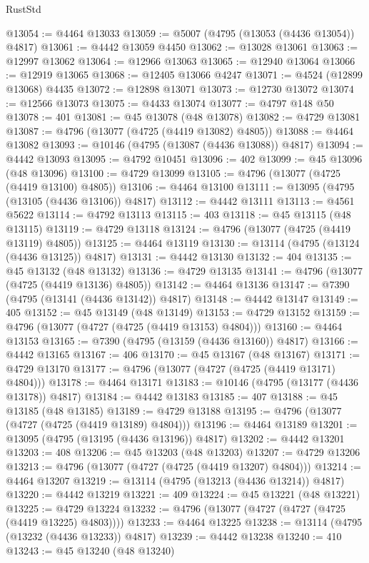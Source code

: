 \begin{lexlean}{RustStd}
\begin{coremodule}
@13054 := @4464 @13033
@13059 := @5007 (@4795 (@13053 (@4436 @13054)) @4817)
@13061 := @4442 @13059 @4450
@13062 := @13028 @13061
@13063 := @12997 @13062
@13064 := @12966 @13063
@13065 := @12940 @13064
@13066 := @12919 @13065
@13068 := @12405 @13066 @4247
@13071 := @4524 (@12899 @13068) @4435
@13072 := @12898 @13071
@13073 := @12730 @13072
@13074 := @12566 @13073
@13075 := @4433 @13074
@13077 := @4797 @148 @50
@13078 := 401
@13081 := @45 @13078 (@48 @13078)
@13082 := @4729 @13081
@13087 := @4796 (@13077 (@4725 (@4419 @13082) @4805))
@13088 := @4464 @13082
@13093 := @10146 (@4795 (@13087 (@4436 @13088)) @4817)
@13094 := @4442 @13093
@13095 := @4792 @10451
@13096 := 402
@13099 := @45 @13096 (@48 @13096)
@13100 := @4729 @13099
@13105 := @4796 (@13077 (@4725 (@4419 @13100) @4805))
@13106 := @4464 @13100
@13111 := @13095 (@4795 (@13105 (@4436 @13106)) @4817)
@13112 := @4442 @13111
@13113 := @4561 @5622
@13114 := @4792 @13113
@13115 := 403
@13118 := @45 @13115 (@48 @13115)
@13119 := @4729 @13118
@13124 := @4796 (@13077 (@4725 (@4419 @13119) @4805))
@13125 := @4464 @13119
@13130 := @13114 (@4795 (@13124 (@4436 @13125)) @4817)
@13131 := @4442 @13130
@13132 := 404
@13135 := @45 @13132 (@48 @13132)
@13136 := @4729 @13135
@13141 := @4796 (@13077 (@4725 (@4419 @13136) @4805))
@13142 := @4464 @13136
@13147 := @7390 (@4795 (@13141 (@4436 @13142)) @4817)
@13148 := @4442 @13147
@13149 := 405
@13152 := @45 @13149 (@48 @13149)
@13153 := @4729 @13152
@13159 := @4796 (@13077 (@4727 (@4725 (@4419 @13153) @4804)))
@13160 := @4464 @13153
@13165 := @7390 (@4795 (@13159 (@4436 @13160)) @4817)
@13166 := @4442 @13165
@13167 := 406
@13170 := @45 @13167 (@48 @13167)
@13171 := @4729 @13170
@13177 := @4796 (@13077 (@4727 (@4725 (@4419 @13171) @4804)))
@13178 := @4464 @13171
@13183 := @10146 (@4795 (@13177 (@4436 @13178)) @4817)
@13184 := @4442 @13183
@13185 := 407
@13188 := @45 @13185 (@48 @13185)
@13189 := @4729 @13188
@13195 := @4796 (@13077 (@4727 (@4725 (@4419 @13189) @4804)))
@13196 := @4464 @13189
@13201 := @13095 (@4795 (@13195 (@4436 @13196)) @4817)
@13202 := @4442 @13201
@13203 := 408
@13206 := @45 @13203 (@48 @13203)
@13207 := @4729 @13206
@13213 := @4796 (@13077 (@4727 (@4725 (@4419 @13207) @4804)))
@13214 := @4464 @13207
@13219 := @13114 (@4795 (@13213 (@4436 @13214)) @4817)
@13220 := @4442 @13219
@13221 := 409
@13224 := @45 @13221 (@48 @13221)
@13225 := @4729 @13224
@13232 := @4796 (@13077 (@4727 (@4727 (@4725 (@4419 @13225) @4803))))
@13233 := @4464 @13225
@13238 := @13114 (@4795 (@13232 (@4436 @13233)) @4817)
@13239 := @4442 @13238
@13240 := 410
@13243 := @45 @13240 (@48 @13240)

\end{coremodule}
\end{lexlean}
